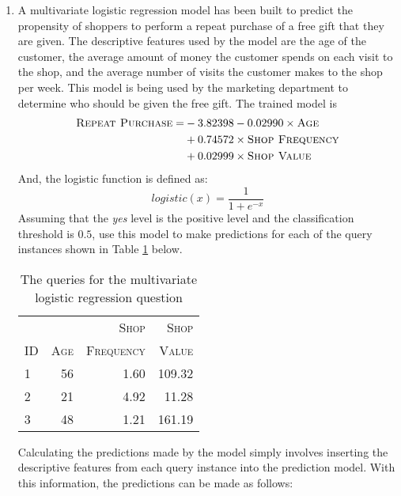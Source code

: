 \documentclass[--SOLUTION-OPTION--]{ditpaper}
\begin{document}
\begin{enumerate}
\item A multivariate logistic regression model has been built to predict the propensity of shoppers to perform a repeat purchase of a free gift that they are given. The descriptive features used by the model are the age of the customer, the average amount of money the customer spends on each visit to the shop, and the average number of visits the customer makes to the shop per week. This model is being used by the marketing department to determine who should be given the free gift. The trained model is
\begin{alignat*}{2}
\textsc{Repeat~Purchase} = & -3.82398 - 0.02990   \times \textsc{Age} \\ 
& + 0.74572 \times \textsc{Shop~Frequency}\\
& + 0.02999 \times \textsc{Shop~Value}
\end{alignat*}
And, the logistic function is defined as:
\begin{equation*}
	logistic(x)=\frac{1}{1+e^{-x}}
\end{equation*}
Assuming that the \textit{yes} level is the positive level and the classification threshold is $0.5$, use this model to make predictions for each of the query instances shown in Table \ref{tab:logregress} below.

\begin{table}[!hb]
\caption{The queries for the multivariate logistic regression question}
\label{tab:logregress}
\begin{center}
\begin{tabular}{l r r r}
\hline
			 & ~ & \textsc{Shop}  & \textsc{Shop}\\
				\textsc{ID} & \textsc{Age} & \textsc{Frequency}  & \textsc{Value}\\
\hline
1 & 56 & 1.60 & 109.32 \\ 
2 & 21 & 4.92 & 11.28 \\  
3 & 48 & 1.21 & 161.19 \\ 
\hline
\end{tabular}
\end{center}
\end{table}
		\begin{answer}
		Calculating the predictions made by the model simply involves inserting the descriptive features from each query instance into the prediction model. With this information, the predictions can be made as follows:
				

\end{answer}
\end{enumerate}
\end{document}
